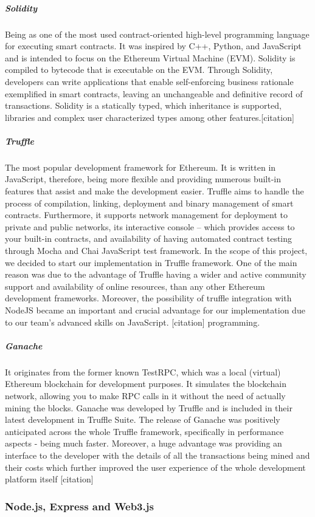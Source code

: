\subparagraph{Solidity}
Being as one of the most used contract-oriented high-level programming language for executing smart contracts. It was inspired by C++, Python, and JavaScript and is intended to focus on the Ethereum Virtual Machine (EVM). Solidity is compiled to bytecode that is executable on the EVM. Through Solidity, developers can write applications that enable self-enforcing business rationale exemplified in smart contracts, leaving an unchangeable and definitive record of transactions. Solidity is a statically typed, which inheritance is supported, libraries and complex user characterized types among other features.[citation]

\subparagraph{Truffle}
The most popular development framework for Ethereum. It is written in JavaScript, therefore, being more flexible and providing numerous built-in features that assist and make the development easier. Truffle aims to handle the process of compilation, linking, deployment and binary management of smart contracts. Furthermore, it supports network management for deployment to private and public networks, its interactive console – which provides access to your built-in contracts, and availability of having automated contract testing through Mocha and Chai JavaScript test framework. In the scope of this project, we decided to start our implementation in Truffle framework. One of the main reason was due to the advantage of Truffle having a wider and active community support and availability of online resources, than any other Ethereum development frameworks. Moreover, the possibility of truffle integration with NodeJS became an important and crucial advantage for our implementation due to our team’s advanced skills on JavaScript. [citation] programming.

\subparagraph{Ganache}
It originates from the former known TestRPC,  which was a local (virtual) Ethereum blockchain for development purposes. It simulates the blockchain network, allowing you to make RPC calls in it without the need of actually mining the blocks. Ganache was developed by Truffle and is included in their latest development in Truffle Suite. The release of Ganache was positively anticipated across the whole Truffle framework, specifically in performance aspects - being much faster. Moreover, a huge advantage was providing an interface to the developer with the details of all the transactions being mined and their costs which further improved the user experience of the whole development platform itself [citation]


\subsubsection{Node.js, Express and Web3.js}

